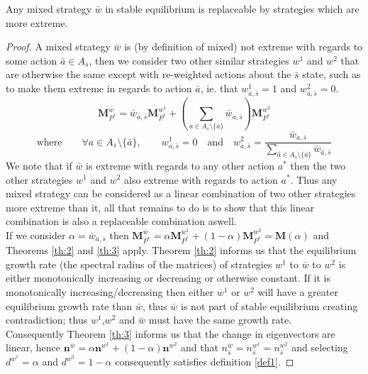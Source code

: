 \begin{Lemma}\label{lemma:part1}
Any mixed strategy $\bar{w}$ in stable equilibrium is replaceable by strategies which are more extreme.
\end{Lemma}
\begin{proof}
A mixed strategy $\bar{w}$ is (by definition of mixed) not extreme with regards to some action $\bar{a}\in A_{\bar{s}}$, then we consider two other similar strategies $w^1$ and $w^2$ that are otherwise the same except with re-weighted actions about the $\bar{s}$ state, such as to make them extreme in regards to action $\bar{a}$, ie. that $w^1_{\bar{a},\bar{s}}=1$ and $w^2_{\bar{a},\bar{s}}=0$.
$$ \mathbf{M}_{P^*}^{\bar{w}} = \bar{w}_{\bar{a},\bar{s}}\mathbf{M}_{P^*}^{w^1} + \left(\sum_{a\in A_{\bar{s}}\setminus \{\bar{a}\}} \bar{w}_{a,\bar{s}}\right)\mathbf{M}_{P^*}^{w^2} $$
$$\text{where}\qquad \forall a\in A_{\bar{s}}\setminus \{\bar{a}\},\qquad  w^1_{a,\bar{s}}=0 \quad\text{and}\quad w^2_{a,\bar{s}} = \frac{\bar{w}_{a,\bar{s}}}{\sum_{\hat{a}\in A_{\bar{s}}\setminus \{\bar{a}\}} \bar{w}_{\hat{a},\bar{s}}} $$
We note that if $\bar{w}$ is extreme with regards to any other action $a^*$ then the two other strategies $w^1$ and $w^2$ also extreme with regards to action $a^*$.
Thus any mixed strategy can be considered as a linear combination of two other strategies more extreme than it, all that remains to do is to show that this linear combination is also a replaceable combination aswell.\\
If we consider $\alpha = \bar{w}_{\bar{a},\bar{s}}$ then $\mathbf{M}_{P^*}^{\bar{w}} = \alpha\mathbf{M}_{P^*}^{w^1} + (1-\alpha)\mathbf{M}_{P^*}^{w^2} = \mathbf{M}(\alpha)$ and Theorems \ref{th:2} and \ref{th:3} apply.
Theorem \ref{th:2} informs us that the equilibrium growth rate (the spectral radius of the matrices) of strategies $w^1$ to $\bar{w}$ to $w^2$ is either monotonically increasing or decreasing or otherwise constant.
If it is monotonically increasing/decreasing then either $w^1$ or $w^2$ will have a greater equilibrium growth rate than $\bar{w}$, thus $\bar{w}$ is not part of stable equilibrium creating contradiction; thus $w^1$,$w^2$ and $\bar{w}$ must have the same growth rate.\\
Consequently Theorem \ref{th:3} informs us that the change in eigenvectors are linear, hence $\mathbf{n}^{\bar{w}} = \alpha \mathbf{n}^{w^1} + (1-\alpha)\mathbf{n}^{w^2}$ and that $n^{\bar{w}}_{\bar{s}} = n^{w^1}_{\bar{s}} = n^{w^2}_{\bar{s}}$ and selecting $d^{w^1} = \alpha$ and $d^{w^2} = 1-\alpha$ consequently satisfies definition \ref{def1}.
\end{proof}


